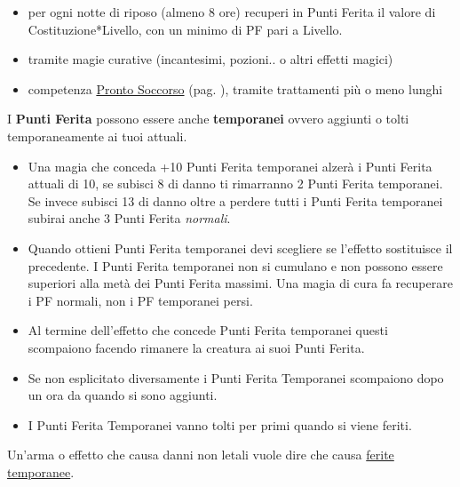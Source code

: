 \begin{itemize}[leftmargin=*] \setlength{\itemsep}{0pt}

\item per ogni notte di riposo (almeno 8 ore) recuperi in Punti Ferita il valore di Costituzione*Livello, con un minimo di PF pari a Livello. 

\item tramite magie curative (incantesimi, pozioni.. o altri effetti magici)

\item competenza \hyperlink{prontosoccorso}{Pronto Soccorso} (pag. \pageref{prontosoccorso}), tramite trattamenti più o meno lunghi

\end{itemize}

I \textbf{Punti Ferita} possono essere anche \textbf{temporanei} ovvero aggiunti o tolti temporaneamente ai tuoi attuali.

\noindent\begin{itemize}[leftmargin=*] \setlength{\itemsep}{0pt}

\item Una magia che conceda +10 Punti Ferita temporanei alzerà i Punti Ferita attuali di 10, se subisci 8 di danno ti rimarranno 2 Punti Ferita temporanei. Se invece subisci 13 di danno oltre a perdere tutti i Punti Ferita temporanei subirai anche 3 Punti Ferita \emph{normali}.

\item Quando ottieni Punti Ferita temporanei devi scegliere se l'effetto sostituisce il precedente. I Punti Ferita temporanei non si cumulano e non possono essere superiori alla metà dei Punti Ferita massimi. Una magia di cura fa recuperare i PF normali, non i PF temporanei persi.

\item Al termine dell'effetto che concede Punti Ferita temporanei questi scompaiono facendo rimanere la creatura ai suoi Punti Ferita.

\item Se non esplicitato diversamente i Punti Ferita Temporanei scompaiono dopo un ora da quando si sono aggiunti.

\item I Punti Ferita Temporanei vanno tolti per primi quando si viene feriti.

\end{itemize}

Un'arma o effetto che causa danni non letali vuole dire che causa \hyperlink{recuperopuntiferitanonletali}{ferite temporanee}\label{feritetemporanee}.
